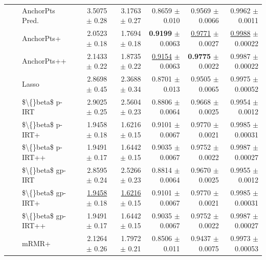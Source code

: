 \begin{longtable}{llp{}rrrrr}
 &  & AnchorPts Pred. & 3.5075 {\scriptsize $\pm$ 0.28} & 3.1763 {\scriptsize $\pm$ 0.27} & 0.8659 {\scriptsize $\pm$ 0.010} & 0.9569 {\scriptsize $\pm$ 0.0066} & 0.9962 {\scriptsize $\pm$ 0.0011} \\
 &  & AnchorPts+ & 2.0523 {\scriptsize $\pm$ 0.18} & 1.7694 {\scriptsize $\pm$ 0.18} & \textbf{0.9199} {\scriptsize $\pm$ 0.0063} & \underline{0.9771} {\scriptsize $\pm$ 0.0027} & \underline{0.9988} {\scriptsize $\pm$ 0.00022} \\
 &  & AnchorPts++ & 2.1433 {\scriptsize $\pm$ 0.22} & 1.8735 {\scriptsize $\pm$ 0.22} & \underline{0.9154} {\scriptsize $\pm$ 0.0063} & \textbf{0.9775} {\scriptsize $\pm$ 0.0022} & 0.9987 {\scriptsize $\pm$ 0.00022} \\
 &  & Lasso & 2.8698 {\scriptsize $\pm$ 0.45} & 2.3688 {\scriptsize $\pm$ 0.34} & 0.8701 {\scriptsize $\pm$ 0.013} & 0.9505 {\scriptsize $\pm$ 0.0065} & 0.9975 {\scriptsize $\pm$ 0.00052} \\
 &  & \$\textbackslash\{\}beta\$ p-IRT & 2.9025 {\scriptsize $\pm$ 0.25} & 2.5604 {\scriptsize $\pm$ 0.23} & 0.8806 {\scriptsize $\pm$ 0.0064} & 0.9668 {\scriptsize $\pm$ 0.0025} & 0.9954 {\scriptsize $\pm$ 0.0012} \\
 &  & \$\textbackslash\{\}beta\$ p-IRT+ & 1.9458 {\scriptsize $\pm$ 0.18} & 1.6216 {\scriptsize $\pm$ 0.15} & 0.9101 {\scriptsize $\pm$ 0.0067} & 0.9770 {\scriptsize $\pm$ 0.0021} & 0.9985 {\scriptsize $\pm$ 0.00031} \\
 &  & \$\textbackslash\{\}beta\$ p-IRT++ & 1.9491 {\scriptsize $\pm$ 0.17} & 1.6442 {\scriptsize $\pm$ 0.15} & 0.9035 {\scriptsize $\pm$ 0.0067} & 0.9752 {\scriptsize $\pm$ 0.0022} & 0.9987 {\scriptsize $\pm$ 0.00027} \\
 &  & \$\textbackslash\{\}beta\$ gp-IRT & 2.8595 {\scriptsize $\pm$ 0.24} & 2.5266 {\scriptsize $\pm$ 0.23} & 0.8814 {\scriptsize $\pm$ 0.0064} & 0.9670 {\scriptsize $\pm$ 0.0025} & 0.9955 {\scriptsize $\pm$ 0.0012} \\
 &  & \$\textbackslash\{\}beta\$ gp-IRT+ & \underline{1.9458} {\scriptsize $\pm$ 0.18} & \underline{1.6216} {\scriptsize $\pm$ 0.15} & 0.9101 {\scriptsize $\pm$ 0.0067} & 0.9770 {\scriptsize $\pm$ 0.0021} & 0.9985 {\scriptsize $\pm$ 0.00031} \\
 &  & \$\textbackslash\{\}beta\$ gp-IRT++ & 1.9491 {\scriptsize $\pm$ 0.17} & 1.6442 {\scriptsize $\pm$ 0.15} & 0.9035 {\scriptsize $\pm$ 0.0067} & 0.9752 {\scriptsize $\pm$ 0.0022} & 0.9987 {\scriptsize $\pm$ 0.00027} \\
 &  & mRMR+ & 2.1264 {\scriptsize $\pm$ 0.26} & 1.7972 {\scriptsize $\pm$ 0.21} & 0.8506 {\scriptsize $\pm$ 0.011} & 0.9437 {\scriptsize $\pm$ 0.0075} & 0.9973 {\scriptsize $\pm$ 0.00053} \\

\end{longtable}
